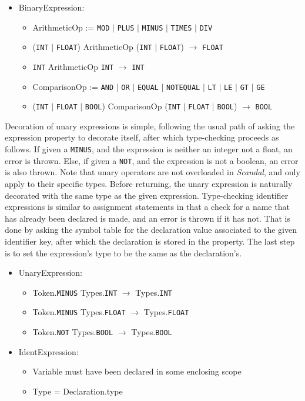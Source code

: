 \begin{itemize}
	\item BinaryExpression:
		\begin{itemize}
			\item ArithmeticOp := \texttt{MOD} $|$ \texttt{PLUS} $|$ \texttt{MINUS} $|$ \texttt{TIMES} $|$ \texttt{DIV}
			\item (\texttt{INT} $|$ \texttt{FLOAT}) ArithmeticOp (\texttt{INT} $|$ \texttt{FLOAT}) $\to$ \texttt{FLOAT}
			\item \texttt{INT} ArithmeticOp \texttt{INT} $\to$ \texttt{INT}
			\item ComparisonOp := \texttt{AND} $|$ \texttt{OR} $|$ \texttt{EQUAL} $|$ \texttt{NOTEQUAL} $|$ \texttt{LT} $|$ \texttt{LE} $|$ \texttt{GT} $|$ \texttt{GE}
			\item (\texttt{INT} $|$ \texttt{FLOAT} $|$ \texttt{BOOL}) ComparisonOp (\texttt{INT} $|$ \texttt{FLOAT} $|$ \texttt{BOOL}) $\to$ \texttt{BOOL}
		\end{itemize}
\end{itemize}

Decoration of unary expressions is simple, following the usual path of asking the expression property to decorate itself, after which type-checking proceeds as follows. If given a \texttt{MINUS}, and the expression is neither an integer not a float, an error is thrown. Else, if given a \texttt{NOT}, and the expression is not a boolean, an error is also thrown. Note that unary operators are not overloaded in \emph{Scandal}, and only apply to their specific types. Before returning, the unary expression is naturally decorated with the same type as the given expression. Type-checking identifier expressions is similar to assignment statements in that a check for a name that has already been declared is made, and an error is thrown if it has not. That is done by asking the symbol table for the declaration value associated to the given identifier key, after which the declaration is stored in the  property. The last step is to set the expression's type to be the same as the declaration's.

\begin{itemize}
	\item UnaryExpression:
		\begin{itemize}
			\item Token.\texttt{MINUS} Types.\texttt{INT} $\to$ Types.\texttt{INT}
			\item Token.\texttt{MINUS} Types.\texttt{FLOAT} $\to$ Types.\texttt{FLOAT}
			\item Token.\texttt{NOT} Types.\texttt{BOOL} $\to$ Types.\texttt{BOOL}
		\end{itemize}
	\item IdentExpression:
		\begin{itemize}
			\item Variable must have been declared in some enclosing scope
			\item Type = Declaration.type
		\end{itemize}
\end{itemize}

